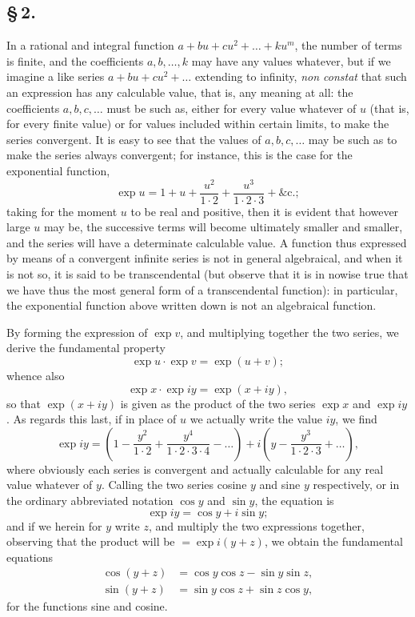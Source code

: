 \documentclass[11pt,a4paper]{book}
\begin{document}
\subsection*{\S\,2.}

In a rational and integral function $a + bu + cu^{2} + \ldots + ku^{m}$, the number of terms is finite, and the coefficients $a, b, \ldots, k$ may have any values whatever, but if we imagine a like series $a + bu + cu^{2} + \ldots$ extending to infinity, \textit{non constat} that such an expression has any calculable value, that is, any meaning at all: the coefficients $a, b, c, \ldots$ must be such as, either for every value whatever of $u$ (that is, for every finite value) or for values included within certain limits, to make the series convergent. It is easy to see that the values of $a, b, c, \ldots$ may be such as to make the series always convergent; for instance, this is the case for the exponential function,
\[
\exp u = 1 + u + \frac{u^{2}}{1 \cdot 2} + \frac{u^{3}}{1 \cdot 2 \cdot 3} + \&\text{c.};
\]
taking for the moment $u$ to be real and positive, then it is evident that however large $u$ may be, the successive terms will become ultimately smaller and smaller, and the series will have a determinate calculable value. A function thus expressed by means of a convergent infinite series is not in general algebraical, and when it is not so, it is said to be transcendental (but observe that it is in nowise true that we have thus the most general form of a transcendental function): in particular, the exponential function above written down is not an algebraical function.

By forming the expression of $\exp v$, and multiplying together the two series, we derive the fundamental property
\[
\exp u \cdot \exp v = \exp(u + v);
\]
whence also
\[
\exp x \cdot \exp iy = \exp(x + iy),
\]
so that $\exp(x + iy)$ is given as the product of the two series $\exp x$ and $\exp iy$. As regards this last, if in place of $u$ we actually write the value $iy$, we find
\[
\exp iy = \left(1 - \frac{y^{2}}{1 \cdot 2} + \frac{y^{4}}{1 \cdot 2 \cdot 3 \cdot 4} - \ldots\right) + i\left(y - \frac{y^{3}}{1 \cdot 2 \cdot 3} + \ldots\right),
\]
where obviously each series is convergent and actually calculable for any real value whatever of $y$. Calling the two series cosine $y$ and sine $y$ respectively, or in the ordinary abbreviated notation $\cos y$ and $\sin y$, the equation is
\[
\exp iy = \cos y + i \sin y;
\]
and if we herein for $y$ write $z$, and multiply the two expressions together, observing that the product will be $= \exp i(y + z)$, we obtain the fundamental equations
\begin{align*}
\cos(y + z) &= \cos y \cos z - \sin y \sin z, \\
\sin(y + z) &= \sin y \cos z + \sin z \cos y,
\end{align*}
for the functions sine and cosine.
\end{document}
